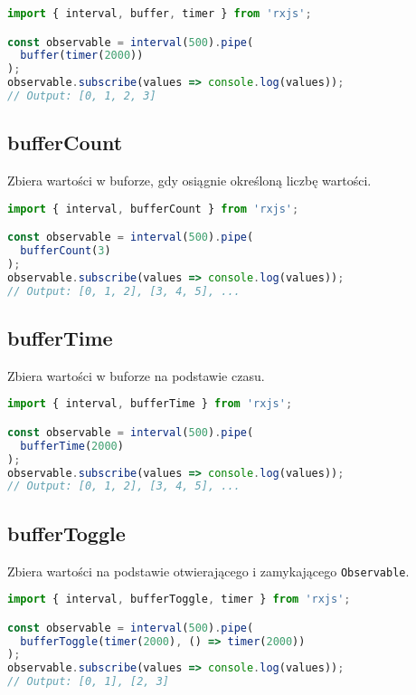 \documentclass[a4paper,12pt]{article}
\begin{document}
\begin{lstlisting}[language=JavaScript, caption=Przykład użycia \texttt{buffer}]
import { interval, buffer, timer } from 'rxjs';

const observable = interval(500).pipe(
  buffer(timer(2000))
);
observable.subscribe(values => console.log(values));
// Output: [0, 1, 2, 3]
\end{lstlisting}

\subsection{bufferCount}
Zbiera wartości w buforze, gdy osiągnie określoną liczbę wartości.

\begin{lstlisting}[language=JavaScript, caption=Przykład użycia \texttt{bufferCount}]
import { interval, bufferCount } from 'rxjs';

const observable = interval(500).pipe(
  bufferCount(3)
);
observable.subscribe(values => console.log(values));
// Output: [0, 1, 2], [3, 4, 5], ...
\end{lstlisting}

\subsection{bufferTime}
Zbiera wartości w buforze na podstawie czasu.

\begin{lstlisting}[language=JavaScript, caption=Przykład użycia \texttt{bufferTime}]
import { interval, bufferTime } from 'rxjs';

const observable = interval(500).pipe(
  bufferTime(2000)
);
observable.subscribe(values => console.log(values));
// Output: [0, 1, 2], [3, 4, 5], ...
\end{lstlisting}

\subsection{bufferToggle}
Zbiera wartości na podstawie otwierającego i zamykającego \texttt{Observable}.

\begin{lstlisting}[language=JavaScript, caption=Przykład użycia \texttt{bufferToggle}]
import { interval, bufferToggle, timer } from 'rxjs';

const observable = interval(500).pipe(
  bufferToggle(timer(2000), () => timer(2000))
);
observable.subscribe(values => console.log(values));
// Output: [0, 1], [2, 3]
\end{lstlisting}
\end{document}
